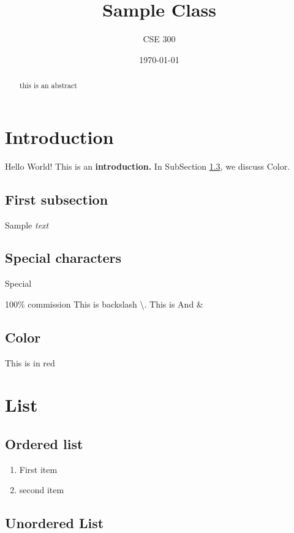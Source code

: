 \documentclass[letter, 12pt]{article}
\author{CSE 300}
\date{\today}
\title{Sample Class}
\begin{document}
\maketitle 
\tableofcontents

\pagebreak


\begin{abstract}
	this is an abstract
\end{abstract}


\section{Introduction}
Hello World!
This is an \textbf{introduction.} 
In SubSection \ref{sec:col}, we discuss Color.

\subsection{First subsection}
Sample \textit{text}


\subsection{Special characters}

Special %



100\% commission 
This is backslash \textbackslash .
This is And \&


\subsection{Color}
\label{sec:col}

{\color{red} This is in red}

\section{List}

\subsection{Ordered list}

\begin{enumerate}
	\item First item
	\item second item
\end{enumerate}

\subsection{Unordered List}
\end{document}
